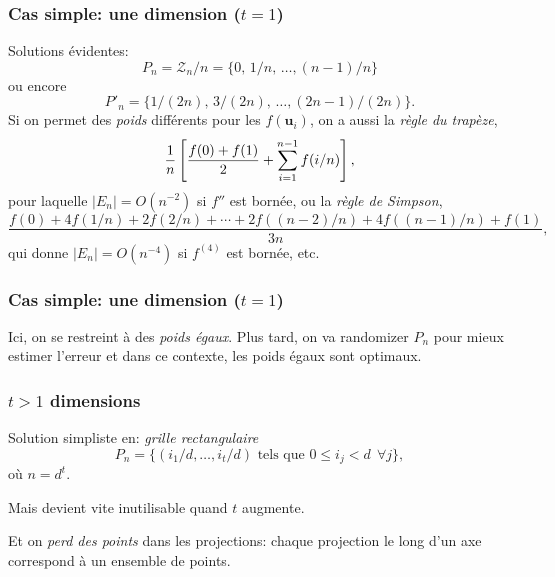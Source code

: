 \documentclass[t,usepdftitle=false]{beamer}
\def\bu{\boldsymbol{u}}
\def\q{\quad}
\def\ZZ{\mathcal{Z}}
\begin{document}
\begin{frame}
\frametitle{Cas simple: une dimension ($t=1$)}

Solutions \'evidentes:
\[
P_n = \ZZ_n/n = \{0,\, 1/n,\, \dots, (n-1)/n\}\]
ou encore
\[
P'_n = \{1/(2n),\, 3/(2n),\, \dots, (2n-1)/(2n)\}.
\]
Si on permet des \emph{poids} diff\'erents pour les $f(\bu_i)$, on a aussi
la \emph{r\`egle du trap\`eze}, 
\[
{1\over n} \left[{f(0) + f(1)\over 2} + \sum_{i=1}^{n-1} f(i/n) \right],
\]
pour laquelle $|E_n| = O(n^{-2})$ si $f''$ est born\'ee, 
ou la \emph{r\`egle de Simpson},
\[
\frac{f(0) + 4f(1/n) + 2f(2/n) + \cdots 
	+ 2f((n-2)/n) + 4f((n-1)/n) + f(1)}{3n},
\]
qui donne $|E_n| = O(n^{-4})$ si $f^{(4)}$ est born\'ee, etc.

\end{frame}

\begin{frame}
\frametitle{Cas simple: une dimension ($t=1$)}

Ici, on se restreint \`a des \emph{poids \'egaux}.
Plus tard, on va randomizer $P_n$ pour mieux estimer l'erreur et dans ce
contexte, les poids \'egaux sont optimaux.

\end{frame}

\begin{frame}
\frametitle{$t > 1$ dimensions}

Solution simpliste en: \emph{grille rectangulaire}
\[
P_n = \{(i_1/d,\dots,i_t/d) \mbox{ tels que } 0\le i_j < d \ \ \forall j\},
\]
o\`u $n = d^t$. \q

\mbox{}

Mais devient vite inutilisable quand $t$ augmente.

\mbox{}

Et on \emph{perd des points} dans les projections: chaque projection le long d'un axe correspond à un ensemble de points.

\end{frame}
\end{document}
